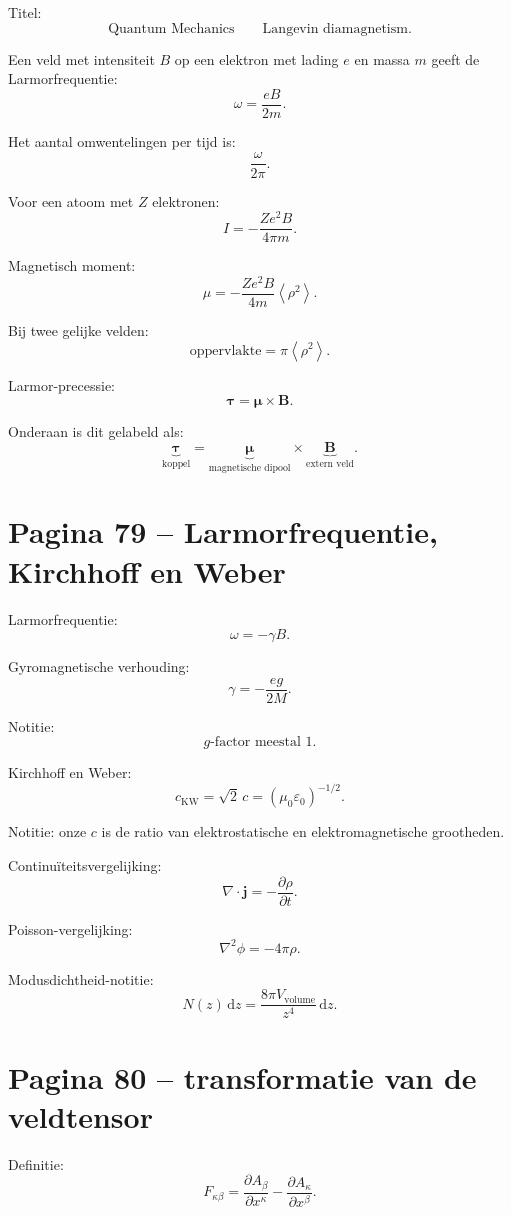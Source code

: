 \documentclass[11pt,a4paper]{article}
\newcommand{\vect}[1]{\mathbf{#1}}
\newcommand{\dd}{\,\mathrm{d}}
\begin{document}
Titel:
$$
\text{Quantum Mechanics}
\qquad
\text{Langevin diamagnetism}.
$$

Een veld met intensiteit $B$ op een elektron met lading $e$ en massa $m$ geeft de Larmorfrequentie:
$$
\omega
=
\frac{eB}{2m}.
$$

Het aantal omwentelingen per tijd is:
$$
\frac{\omega}{2\pi}.
$$

Voor een atoom met $Z$ elektronen:
$$
I
=
-\frac{Ze^{2}B}{4\pi m}.
$$

Magnetisch moment:
$$
\mu
=
-\frac{Ze^{2}B}{4m}
\left\langle \rho^{2}\right\rangle.
$$

Bij twee gelijke velden:
$$
\text{oppervlakte}
=
\pi\left\langle \rho^{2}\right\rangle.
$$

Larmor-precessie:
$$
\bm{\tau}
=
\bm{\mu}\times\vect{B}.
$$

Onderaan is dit gelabeld als:
\[
\underbrace{\bm{\tau}}_{\text{koppel}}
=
\underbrace{\bm{\mu}}_{\text{magnetische dipool}}
\times
\underbrace{\vect{B}}_{\text{extern veld}}.
\]

\section*{Pagina 79 -- Larmorfrequentie, Kirchhoff en Weber}

Larmorfrequentie:
$$
\omega=-\gamma B.
$$

Gyromagnetische verhouding:
$$
\gamma
=
-\frac{eg}{2M}.
$$

Notitie:
$$
g\text{-factor meestal }1.
$$

Kirchhoff en Weber:
$$
c_{\mathrm{KW}}
=
\sqrt{2}\,c
=
(\mu_0\varepsilon_0)^{-1/2}.
$$

Notitie: onze $c$ is de ratio van elektrostatische en elektromagnetische grootheden.

Continuïteitsvergelijking:
$$
\nabla\cdot\vect{j}
=
-\frac{\partial\rho}{\partial t}.
$$

Poisson-vergelijking:
$$
\nabla^{2}\phi
=
-4\pi\rho.
$$

Modusdichtheid-notitie:
$$
N(z)\dd z
=
\frac{8\pi V_{\mathrm{volume}}}{z^{4}}\dd z.
$$

\section*{Pagina 80 -- transformatie van de veldtensor}

Definitie:
$$
F_{\kappa\beta}
=
\frac{\partial A_{\beta}}{\partial x^{\kappa}}
-
\frac{\partial A_{\kappa}}{\partial x^{\beta}}.
$$
\end{document}
